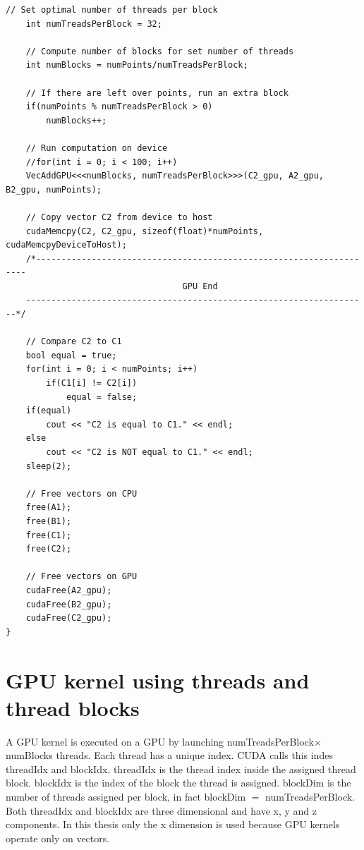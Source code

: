 \begin{lstlisting}[caption={Comparison of CPU verse GPU code.},label={code:GPUvsCPU}]
	// Set optimal number of threads per block
	int numTreadsPerBlock = 32;

	// Compute number of blocks for set number of threads
	int numBlocks = numPoints/numTreadsPerBlock;

	// If there are left over points, run an extra block
	if(numPoints % numTreadsPerBlock > 0)
		numBlocks++;

	// Run computation on device
	//for(int i = 0; i < 100; i++)
	VecAddGPU<<<numBlocks, numTreadsPerBlock>>>(C2_gpu, A2_gpu, B2_gpu, numPoints);

	// Copy vector C2 from device to host
	cudaMemcpy(C2, C2_gpu, sizeof(float)*numPoints, cudaMemcpyDeviceToHost);
	/*--------------------------------------------------------------------
                               	   GPU End
	--------------------------------------------------------------------*/

	// Compare C2 to C1
	bool equal = true;
	for(int i = 0; i < numPoints; i++)
		if(C1[i] != C2[i])
			equal = false;
	if(equal)
		cout << "C2 is equal to C1." << endl;
	else
		cout << "C2 is NOT equal to C1." << endl;
	sleep(2);

	// Free vectors on CPU
	free(A1);
	free(B1);
	free(C1);
	free(C2);

	// Free vectors on GPU
	cudaFree(A2_gpu);
	cudaFree(B2_gpu);
	cudaFree(C2_gpu);
}
\end{lstlisting}
\doublespacing

\section{GPU kernel using threads and thread blocks}
A GPU kernel is executed on a GPU by launching numTreadsPerBlock$\times$numBlocks 
threads.
Each thread has a unique index.
CUDA calls this indes threadIdx and blockIdx.
threadIdx is the thread index inside the assigned thread block.
blockIdx is the index of the block the thread is assigned.
blockDim is the number of threads assigned per block, in fact blockDim $=$ numTreadsPerBlock.
Both threadIdx and blockIdx are three dimensional and have x, y and z components.
In this thesis only the x dimension is used because GPU kernels operate only on vectors.

